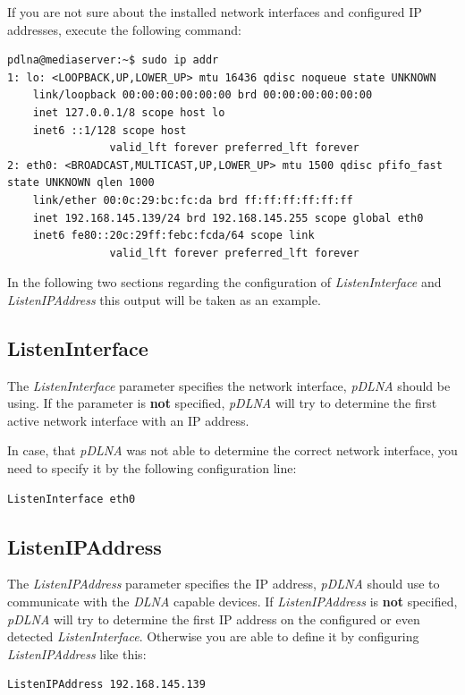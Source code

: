 \documentclass[a4paper,oneside,10pt]{report}
\newenvironment{colframefile}{%
  \begin{Sbox}
    \begin{minipage}{.99\columnwidth}
}{%
  \end{minipage}
  \end{Sbox}
  \begin{center}
    \fcolorbox{black}{Yellow}{\TheSbox}
  \end{center}
}
\begin{document}
If you are not sure about the installed network interfaces and configured IP addresses, execute the following command:
\begin{lstlisting}
pdlna@mediaserver:~$ sudo ip addr
1: lo: <LOOPBACK,UP,LOWER_UP> mtu 16436 qdisc noqueue state UNKNOWN
    link/loopback 00:00:00:00:00:00 brd 00:00:00:00:00:00
    inet 127.0.0.1/8 scope host lo
    inet6 ::1/128 scope host
				valid_lft forever preferred_lft forever
2: eth0: <BROADCAST,MULTICAST,UP,LOWER_UP> mtu 1500 qdisc pfifo_fast state UNKNOWN qlen 1000
    link/ether 00:0c:29:bc:fc:da brd ff:ff:ff:ff:ff:ff
    inet 192.168.145.139/24 brd 192.168.145.255 scope global eth0
    inet6 fe80::20c:29ff:febc:fcda/64 scope link
				valid_lft forever preferred_lft forever
\end{lstlisting}
In the following two sections regarding the configuration of {\em ListenInterface} and {\em ListenIPAddress} this output will be taken as an example.

\subsection{ListenInterface}

The {\em ListenInterface} parameter specifies the network interface, {\em pDLNA} should be using. If the parameter is \textbf{not} specified, {\em pDLNA} will try to determine the first active network interface with an IP address.

In case, that {\em pDLNA} was not able to determine the correct network interface, you need to specify it by the following configuration line:
\begin{colframefile}
\begin{verbatim}
ListenInterface eth0
\end{verbatim}
\end{colframefile}

\subsection{ListenIPAddress}

The {\em ListenIPAddress} parameter specifies the IP address, {\em pDLNA} should use to communicate with the {\em DLNA} capable devices. If {\em ListenIPAddress} is \textbf{not} specified, {\em pDLNA} will try to determine the first IP address on the configured or even detected {\em ListenInterface}. Otherwise you are able to define it by configuring {\em ListenIPAddress} like this:
\begin{colframefile}
\begin{verbatim}
ListenIPAddress 192.168.145.139
\end{verbatim}
\end{colframefile}
\end{document}
